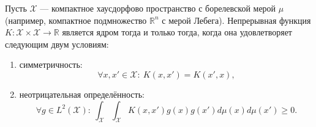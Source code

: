 \begin{theorem}[Мерсер]
    Пусть $\mathcal{X}$ --- компактное хаусдорфово пространство с борелевской мерой $\mu$ (например, компактное подмножество $\mathbb{R}^n$ с мерой Лебега). Непрерывная функция $K \colon \mathcal{X} \times \mathcal{X} \to \mathbb{R}$ является ядром тогда и только тогда, когда она удовлетворяет следующим двум условиям:
    \begin{enumerate}
        \item симметричность: \[ \forall x, x' \in \mathcal{X}: \ K(x, x') = K(x', x), \]
        \item неотрицательная определённость: \[ \forall g \in L^2(\mathcal{X}): \ \int_\mathcal{X} \int_\mathcal{X} K(x, x') g(x) g(x') d\mu(x) d\mu(x') \ge 0. \]
    \end{enumerate}
\end{theorem}
